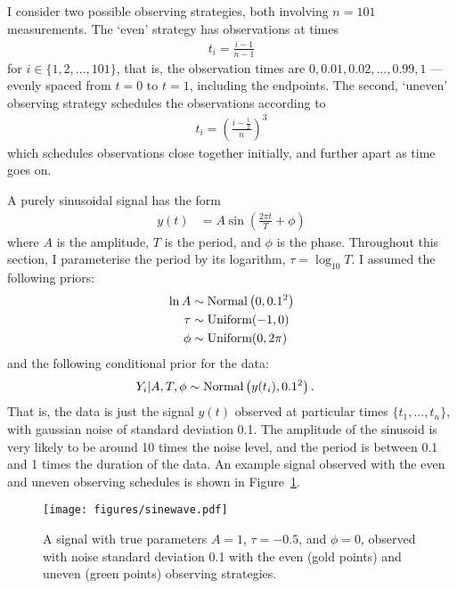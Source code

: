 \documentclass[entropy,article,accept,oneauthor,pdftex,10pt,a4paper]{mdpi}
\begin{document}
I consider two possible observing strategies, both involving
$n=101$ measurements. The `even' strategy has observations at times
\begin{align}
t_i = \frac{i-1}{n-1}
\end{align}
for $i \in \{1, 2, ..., 101\}$, that is, the observation times are
$0, 0.01, 0.02, ..., 0.99, 1$ ---
evenly spaced from $t=0$ to $t=1$, including the endpoints.
The second, `uneven' observing strategy schedules the observations
according to
\begin{align}
t_i = \left(\frac{i - \frac{1}{2}}{n}\right)^3
\end{align}
which schedules observations close together initially, and further apart
as time goes on.

A purely sinusoidal signal has the form
\begin{align}
y(t) &= A \sin \left(\frac{2\pi t}{T} + \phi\right)
\end{align}
where $A$ is the amplitude, $T$ is the period, and $\phi$ is the phase.
Throughout this section, I parameterise the period by its logarithm,
$\tau = \log_{10} T$. I assumed the following priors:
\begin{align}
\ln A   &\sim \textnormal{Normal}\left(0, 0.1^2\right)  \\
\tau    &\sim \textnormal{Uniform}(-1, 0)  \\
\phi    &\sim \textnormal{Uniform}(0, 2\pi)
\end{align}
and the following conditional prior for the data:
\begin{align}
Y_i | A, T, \phi &\sim \textnormal{Normal}\left(y(t_i), 0.1^2\right).
\end{align}
That is, the data is just the signal $y(t)$ observed at particular times
$\{t_1, ..., t_n\}$, with gaussian noise of standard deviation 0.1.
The amplitude of the sinusoid is very likely to be around 10 times the
noise level, and the period is between 0.1 and 1 times the duration of
the data. An example signal observed with the even and uneven observing schedules
is shown in Figure~\ref{fig:sinewave}.

\begin{figure}[!ht]
\centering
\texttt{[image: figures/sinewave.pdf]}
\caption{A signal with true parameters $A=1$, $\tau=-0.5$, and
$\phi=0$, observed with noise standard deviation 0.1 with the
even (gold points) and uneven (green points) observing strategies.
\label{fig:sinewave}}
\end{figure}
\end{document}
